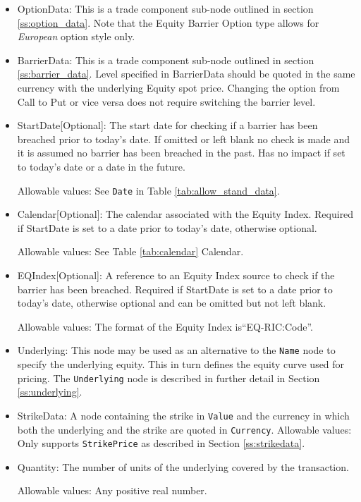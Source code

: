 \begin{itemize}
\item OptionData: This is a trade component sub-node outlined in section \ref{ss:option_data}. Note that the Equity Barrier Option type allows for \emph{European} option style only. 

\item BarrierData: This is a trade component sub-node outlined in section \ref{ss:barrier_data}.
Level specified in BarrierData should be quoted in the same currency with the underlying Equity spot price.
Changing the option from Call to Put or vice versa does not require switching the barrier level.

\item StartDate[Optional]: The start date for checking if a barrier has been breached prior to today's date. If omitted or left blank no check is made and it is assumed no barrier has been breached in the past. Has no impact if set to today's date or a date in the future.

Allowable values:  See \lstinline!Date! in Table \ref{tab:allow_stand_data}.

\item Calendar[Optional]: The calendar associated with the Equity Index. Required if StartDate is set to a date prior to today's date, otherwise optional.

Allowable values: See Table \ref{tab:calendar} Calendar.

\item EQIndex[Optional]: A reference to an Equity Index source to check if the barrier has been breached. Required if StartDate is set to a date prior to today's date, otherwise optional and can be omitted but not left blank.

Allowable values:  The format of the Equity Index is``EQ-RIC:Code''. 

\item Underlying:  This node may be used as an alternative to the \lstinline!Name! node to specify the underlying equity. This in turn defines the equity curve used for pricing. The \lstinline!Underlying! node is described in further detail in Section \ref{ss:underlying}.

\item StrikeData: A node containing the strike in \lstinline!Value! and the currency in which both the underlying and the strike are quoted in \lstinline!Currency!.
Allowable values: Only supports \lstinline!StrikePrice! as described in Section \ref{ss:strikedata}.
	    
\item Quantity: The number of units of the underlying covered by the transaction.
    
Allowable values:  Any positive real number.

\end{itemize}
